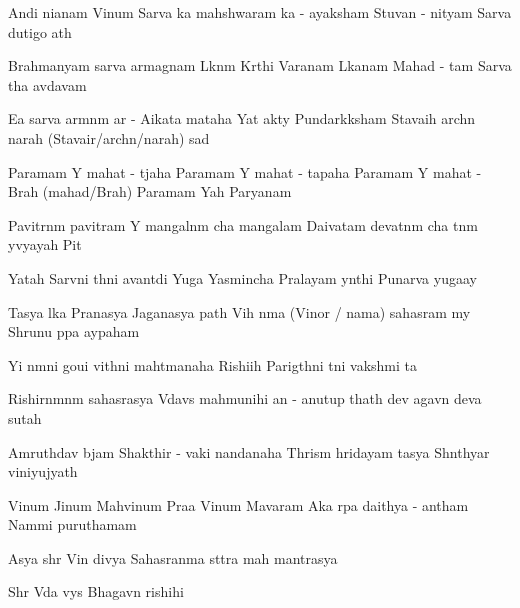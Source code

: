 \documentclass[20pt]{article}
\begin{document}
\SlokaHuge
{An{\aaa}di ni{\dhh}anam Vi{\sh}num} {Sarva {\lo}ka mah{\e}shwaram}
{{\Lo}ka - a{\dhh}yaksham Stuvan - nityam} {Sarva du{\kh}{\A}tigo {\bh}a{\ve}th}

\SlokaHuge
{Brahmanyam sarva {\Dh}armagnam} {L{\oh}k{\A}n{\A}m K{\ee}rthi Var{\dhh}anam}
{L{\oh}kan{\A}{\Th}am Mahad - {\bh}{\oo}tam} {Sarva {\Bh}{\oo}tha {\bh}av{\oh}d{\bh}avam}

\SlokaHuge
{E{\sh}a {\me} sarva {\Dh}arm{\A}n{\A}m} {{\Dh}ar{\mo} - A{\dhh}ikata{\mo} mataha}
{Yat \dsh {\bh}akty{\A} Pundar{\ee}k{\A}ksham} {Stavaih arch{\e}n narah (Stavair/arch{\e}n/narah) sad{\A}}

\novspace
\SlokaHuge
{Paramam Y{\oh} mahat - t{\e}jaha} {Paramam Y{\oh} mahat - tapaha}
{Paramam Y{\oh} mahat - Brah{\ma} (mahad/Brah{\ma})} {Paramam Yah Par{\A}yanam}

\SlokaHuge
{Pavitr{\A}n{\A}m pavitram Y{\oh}} {mangal{\A}n{\A}m cha mangalam}
{Daivatam devat{\A}n{\A}m cha} {{\Bh}{\oo}t{\A}n{\A}m y{\oh}vyayah Pit{\A}}

\SlokaHuge
{Yatah Sarv{\A}ni {\Bh}{\oo}th{\A}ni} {{\Bh}avant{\ya}di Yu{\ga}ga{\me}}
{Yasmin{\sh}cha Pralayam y{\A}nthi} {Punar{\e}va yuga{\ksh}ay{\e}}

\SlokaHuge
{Tasya l{\oh}ka Pra{\dhh}{\A}nasya} {Jagan{\na}{\Th}asya {\Bh}{\oo}path{\e}}
{Vi{\sh}{\no}h \dsh n{\A}ma (Vi{\sh}nor / nama) sahasram m{\e}y} {Shrunu p{\A}pa {\bh}ay{\A}paham}

\novspace
\SlokaHuge
{Y{\an}i n{\A}m{\A}ni goui} {vi{\kh}{\ya}th{\A}ni mah{\A}tmanaha}
{Rishi{\bh}ih Parig{\ee}th{\A}ni} {t{\ha}ni vaksh{\ya}mi {\Bh}{\oo}ta{\ye}}

\SlokaHuge
{Rishirn{\A}mn{\A}m sahasrasya} {V{\e}dav{\ya}s{\oh} mah{\A}munihi}
{{\Ch}an{\dO} - anu{\sh}tup thath{\A} dev{\oh}} {{\Bh}agav{\A}n deva{\ki} sutah}

\SlokaHuge
{Amruth{\am}{\sh}{\oo}d{\bh}av{\oh} b{\ee}jam} {Shakthir - {\De}vaki nandanaha}
{Thris{\A}m{\A} hridayam tasya} {Sh{\aaa}nthyar{\tHe} viniyujyath{\e}}

\SlokaHuge
{Vi{\sh}num Ji{\sh}num Mah{\A}vi{\sh}num} {Pra{\bh}a Vi{\sh}num Ma{\he}{\sh}varam}
{A{\nE}ka r{\oo}pa daithya - antham} {Nam{\A}mi puru{\sho}thamam}

\resetcountr
\novspace
{}

\SlokaHuge
{Asya shr{\ee} Vi{\sh}n{\oh} divya}
{Sahasran{\aaa}ma st{\oh}tra mah{\A} mantrasya}

\SlokaHuge
{Shr{\ee} V{\e}da vy{\A}s{\oh} Bhagav{\A}n rishihi}
\end{document}
